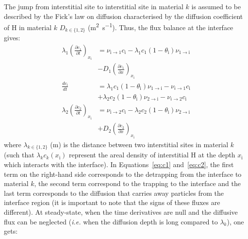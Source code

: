 \indent The jump from interstitial site to interstitial site in material $k$ is assumed to be described by the Fick's law on diffusion characterised by the diffusion coefficient of H in material $k$ $D_{k\in\lbrace 1,2\rbrace}$ (\si{m^{2}.s^{-1}}).
Thus, the flux balance at the interface gives:
\begin{align}
\lambda_1 \left( \frac{\partial c_1}{\partial t} \right)_{x_\mathrm{i}}
                      &= \nu_{\mathrm{i}\rightarrow 1}c_\mathrm{i}
                        -\lambda_1 c_1(1-\theta_\mathrm{i})\nu_{1\rightarrow\mathrm{i}}  \nonumber
                        \\&-D_1\left(\frac{\partial c_1}{\partial x}\right)_{x_\mathrm{i}}
                        \label{eq:c1}
                        \\
\frac{d c_\mathrm{i}}{d t} 
                     &= \lambda_1 c_1 (1-\theta_\mathrm{i})\nu_{1\rightarrow\mathrm{i}}
                       - \nu_{i\rightarrow 1}c_\mathrm{i} \nonumber
                       \\ &+\lambda_2 c_2 (1-\theta_\mathrm{i})\nu_{2\rightarrow\mathrm{i}}
                       - \nu_{i\rightarrow 2}c_\mathrm{i}
                       \label{eq:ci}
                       \\
\lambda_2 \left( \frac{\partial c_2}{\partial t}\right)_{x_\mathrm{i}}
                    &= \nu_{\mathrm{i}\rightarrow 2}c_\mathrm{i}
                      -\lambda_2 c_2 (1-\theta_\mathrm{i})\nu_{2\rightarrow\mathrm{i}} \nonumber
                      \\ &+D_2 \left(\frac{\partial c_2}{\partial x}\right)_{x_\mathrm{i}}
                      \label{eq:c2}
\end{align}
where $\lambda_{k\in\lbrace 1,2 \rbrace}$ (\si{m}) is the distance between two interstitial sites in material $k$ (such that $\lambda_k c_k(x_\mathrm{i})$ represent the areal density of interstitial H at the depth $x_\mathrm{i}$ which interacts with the interface).
In Equations~\ref{eq:c1} and~\ref{eq:c2}, the first term on the right-hand side corresponds to the detrapping from the interface to material $k$, the second term correspond to the trapping to the interface and the last term corresponds to the diffusion that carries away particles from the interface region (it is important to note that the signs of these fluxes are different).
\indent At steady-state, when the time derivatives are null and the diffusive flux can be neglected (\textit{i.e.} when the diffusion depth is long compared to $\lambda_k$), one gets:
